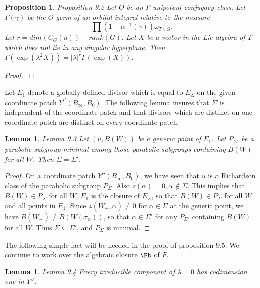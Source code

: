 \documentclass{memo-l}
\newtheorem{lemma}[theorem]{Lemma}
\newtheorem{proposition}[theorem]{Proposition}
\theoremstyle{definition}
\theoremstyle{remark}
\numberwithin{section}{chapter}
\numberwithin{equation}{chapter}
\begin{document}
\begin{proposition}{Proposition 9.2}   Let $O$ be an $F$-unipotent conjugacy class.
 Let ${\Gamma}({\gamma})$ be
the $O$-germ of an orbital integral relative to the measure
$$
\prod (1-{\alpha}^{-1}({\gamma})){\omega}_{T\backslash G}.
$$
Let $r = dim(C_{G}(u))-rank(G)$.
 Let $X$ be a vector in the Lie algebra of $T$ which does not lie in any
singular hyperplane.
 Then ${\Gamma}(\exp({\lambda}^{2}X)) =
\vert {\lambda}\vert ^{r}{\Gamma}(\exp(X))$.
\end{proposition}

\begin{proof}    \cite{MR0579175}
\end{proof}

{\medskip}

   Let $E_{1}$ denote a globally defined divisor which is equal to
$E_{{\Sigma}}$ on the given coordinate patch $Y^{\prime\prime}(B_{{\infty}},B_{0})$.
 The following lemma insures that ${\Sigma}$ is independent of the
coordinate patch and that divisors which are distinct on one coordinate patch
are distinct on every coordinate patch.

\begin{lemma}{Lemma 9.3}    Let $(u,B(W))$ be a generic point of $E_{1}$.
 Let $P_{{\Sigma}'}$ be a parabolic subgroup minimal among those parabolic
subgroups containing $B(W)$ for all $W$.
 Then ${\Sigma} = {\Sigma}'$.
\end{lemma}

\begin{proof}    On a coordinate patch $Y''(B_{{\infty}},B_0)$, we have seen
that $u$ is a Richardson class of the parabolic subgroup $P_{{\Sigma}}$.
 Also $z({\alpha}) = 0, {\alpha} \notin {\Sigma}$.
 This implies that $B(W) \in P_{{\Sigma}}$ for all $W$.
 $E_{1}$ is the closure of $E_{{\Sigma}}$, so that $B(W) \in P_{{\Sigma}}$
for all $W$ and all points in $E_{1}$.
 Since $z(W_{+},{\alpha})\ne 0$ for ${\alpha} \in {\Sigma}$ at the generic
point, we have $B(W_{+})\ne B(W({\sigma}_{{\alpha}}))$, so that ${\alpha}
\in {\Sigma}'$ for any $P_{{\Sigma}'}$ containing $B(W)$ for all $W$.
 Thus ${\Sigma} {\subseteq} {\Sigma}'$, and $P_{{\Sigma}}$ is minimal.
\end{proof}

{\medskip}

   The following simple fact will be needed in the proof of proposition
9.5.
 We continue to work over the algebraic closure $\Fb$  of $F$.

\begin{lemma}{Lemma 9.4}  Every irreducible component of ${\lambda} = 0$ has
codimension one in $Y''$.
\end{lemma}
\end{document}
